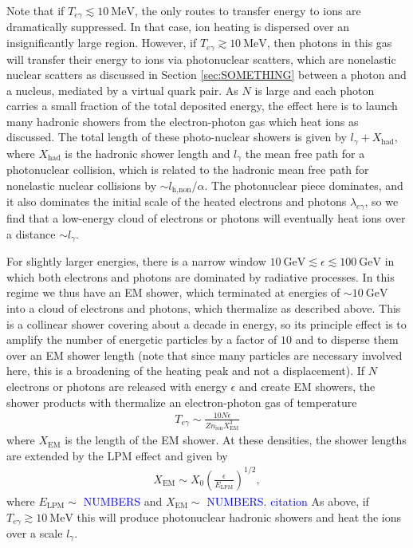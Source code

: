 \documentclass[twocolumn, preprintnumbers,amsmath,amssymb,prd, superscriptaddress]{revtex4}
\newcommand{\GeV}{\text{GeV}}
\newcommand{\MeV}{\text{MeV}}
\def\r{\right)}
\def\l{\left(}
\begin{document}
Note that if $T_{e\gamma} \lesssim 10~\MeV$, the only routes to transfer energy to ions are dramatically suppressed.
In that case, ion heating is dispersed over an insignificantly large region.
However, if $T_{e\gamma} \gtrsim 10~\MeV$, then photons in this gas will transfer their energy to ions via photonuclear scatters, which are nonelastic nuclear scatters as discussed in Section \ref{sec:SOMETHING} between a photon and a nucleus, mediated by a virtual quark pair.
As $N$ is large and each photon carries a small fraction of the total deposited energy, the effect here is to launch many hadronic showers from the electron-photon gas which heat ions as discussed.
The total length of these photo-nuclear showers is given by $l_\gamma + X_\text{had}$, where $X_\text{had}$ is the hadronic shower length and $l_\gamma$ the mean free path for a photonuclear collision, which is related to the hadronic mean free path for nonelastic nuclear collisions by $\sim l_\text{h,non}/\alpha$.
The photonuclear piece dominates, and it also dominates the initial scale of the heated electrons and photons $\lambda_{e\gamma}$, so we find that a low-energy cloud of electrons or photons will eventually heat ions over a distance $\sim l_\gamma$.

For slightly larger energies, there is a narrow window $10~\GeV \lesssim \epsilon \lesssim 100~\GeV$ in which both electrons and photons are dominated by radiative processes.
In this regime we thus have an EM shower, which terminated at energies of $\sim 10~\GeV$ into a cloud of electrons and photons, which thermalize as described above.
This is a collinear shower covering about a decade in energy, so its principle effect is to amplify the number of energetic particles by a factor of $10$ and to disperse them over an EM shower length (note that since many particles are necessary involved here, this is a broadening of the heating peak and not a displacement).
If $N$ electrons or photons are released with energy $\epsilon$ and create EM showers, the shower products with thermalize an electron-photon gas of temperature
\begin{align}
  T_{e\gamma} \sim \frac{10 N \epsilon}{Z n_\text{ion} X_\text{EM}^3}
\end{align}
where $X_\text{EM}$ is the length of the EM shower.
At these densities, the shower lengths are extended by the LPM effect and given by
\begin{align}
  X_\text{EM} \sim X_0 \l \frac{\epsilon}{E_\text{LPM}} \r^{1/2},
\end{align}
where $E_\text{LPM} \sim$ \textcolor{blue}{NUMBERS} and $X_\text{EM} \sim$ \textcolor{blue}{NUMBERS}. \textcolor{blue}{citation}
As above, if $T_{e\gamma} \gtrsim 10~\MeV$ this will produce photonuclear hadronic showers and heat the ions over a scale $l_\gamma$.
\end{document}
